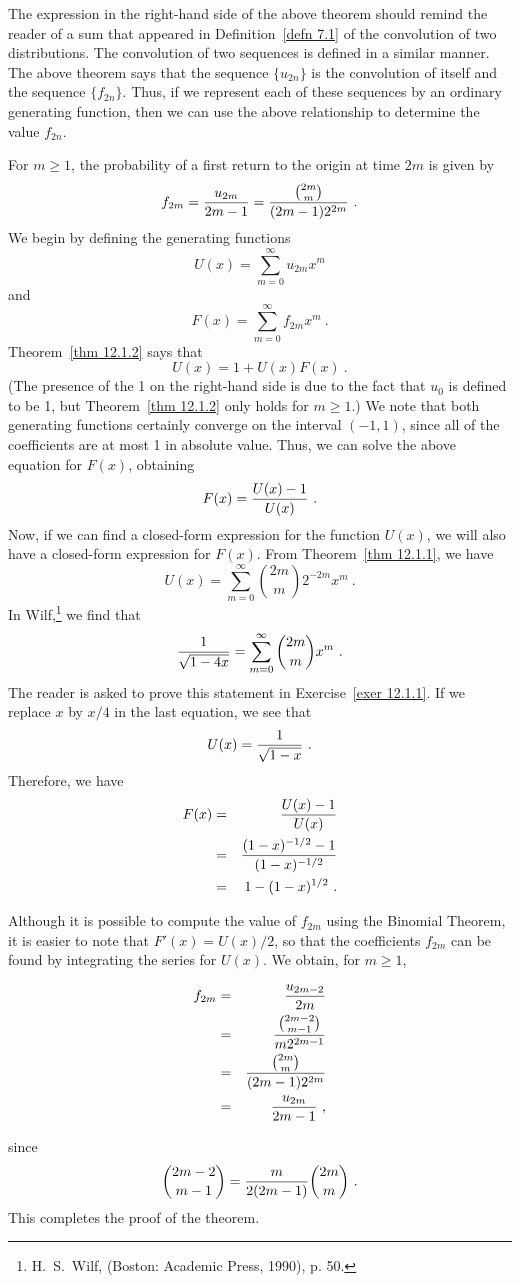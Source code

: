 The expression in the right-hand side of the above theorem should remind the reader of a sum
that appeared in Definition~\ref{defn 7.1} of the convolution of two distributions.  The
convolution of two sequences is defined in a similar manner.  The above theorem says that the
sequence $\{u_{2n}\}$ is the convolution of itself and the sequence
$\{f_{2n}\}$.  Thus, if we represent each of these sequences by an ordinary generating
function, then we can use the above relationship to determine the value $f_{2n}$.
\begin{theorem}\label{thm 12.1.3}
For $m \ge 1$, the probability of a first return to the origin at time $2m$ is given by
$$f_{2m} = {{u_{2m}}\over{2m-1}} = {{2m \choose m}\over{(2m-1)2^{2m}}}\ .$$
\proof
We begin by defining the generating functions
$$U(x) = \sum_{m = 0}^\infty u_{2m}x^m$$
and
$$F(x) = \sum_{m = 0}^\infty f_{2m}x^m\ .$$
Theorem~\ref{thm 12.1.2} says that
\begin{equation} 
U(x) = 1 + U(x)F(x)\ .
\label{eq 12.1.1}  
\end{equation} 
(The presence of the 1 on the right-hand side is due to the fact that $u_0$ is defined to be 1,
but Theorem~\ref{thm 12.1.2} only holds for $m \ge 1$.)  We note that both generating functions
certainly converge on the interval $(-1, 1)$, since all of the coefficients are at most 1 in
absolute value.  Thus, we can solve the above equation for $F(x)$, obtaining
$$F(x) = {{U(x) - 1}\over{U(x)}}\ .$$
Now, if we can find a closed-form expression for the function $U(x)$, we will also have a
closed-form expression for $F(x)$.  From Theorem~\ref{thm 12.1.1}, we have
$$U(x) = \sum_{m = 0}^\infty {2m \choose m}2^{-2m}x^m\ .$$
In Wilf,\footnote{H.~S.~Wilf, 
(Boston: Academic Press, 1990), p. 50.} we find that
$${1\over{\sqrt {1 - 4x}}} = \sum_{m = 0}^\infty {2m \choose m} x^m\ .$$
The reader is asked to prove this statement in Exercise~\ref{exer 12.1.1}.  If we replace $x$ by $x/4$
in the last equation, we see that
$$U(x) = {1\over{\sqrt {1-x}}}\ .$$
Therefore, we have
\begin{eqnarray*}
F(x) &=& {{U(x) - 1}\over{U(x)}}\\
     &=& {{(1-x)^{-1/2} - 1}\over{(1-x)^{-1/2}}}\\
     &=& 1 - (1-x)^{1/2}\ . 
\end{eqnarray*}

Although it is possible to compute the value of $f_{2m}$ using the Binomial Theorem, it is
easier to note that $F'(x) = U(x)/2$, so that the coefficients $f_{2m}$ can be found by
integrating the series for $U(x)$.  We obtain, for $m \ge 1$,

\begin{eqnarray*}
f_{2m} &=& {u_{2m-2}\over{2m}}\\
       &=& {2m-2 \choose m-1}\over{m2^{2m-1}}\\
       &=& {2m \choose m}\over{(2m-1)2^{2m}}\\
       &=& {u_{2m}\over{2m-1}}\ ,
\end{eqnarray*}

since
$${2m-2 \choose m-1} = {m\over{2(2m-1)}}{2m\choose m}\ .$$
This completes the proof of the theorem.
\end{theorem}

